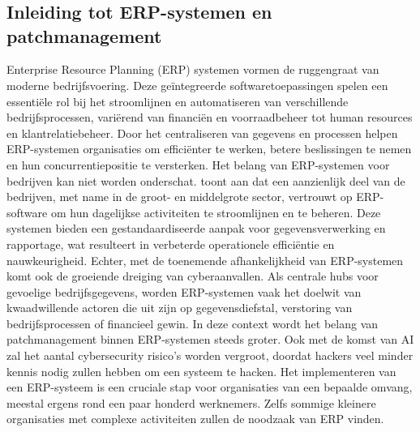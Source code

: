 \chapter{}%
\label{ch:stand-van-zaken}



\section{Inleiding tot ERP-systemen en patchmanagement}
Enterprise Resource Planning (ERP) systemen vormen de ruggengraat van moderne bedrijfsvoering. Deze geïntegreerde softwaretoepassingen spelen een essentiële rol bij het stroomlijnen en automatiseren van verschillende bedrijfsprocessen, variërend van financiën en voorraadbeheer tot human resources en klantrelatiebeheer. Door het centraliseren van gegevens en processen helpen ERP-systemen organisaties om efficiënter te werken, betere beslissingen te nemen en hun concurrentiepositie te versterken.
Het belang van ERP-systemen voor bedrijven kan niet worden onderschat. \textcite{Statistiek-Vlaanderen2022} toont aan dat een aanzienlijk deel van de bedrijven, met name in de groot- en middelgrote sector, vertrouwt op ERP-software om hun dagelijkse activiteiten te stroomlijnen en te beheren. Deze systemen bieden een gestandaardiseerde aanpak voor gegevensverwerking en rapportage, wat resulteert in verbeterde operationele efficiëntie en nauwkeurigheid.
Echter, met de toenemende afhankelijkheid van ERP-systemen komt ook de groeiende dreiging van cyberaanvallen. Als centrale hubs voor gevoelige bedrijfsgegevens, worden ERP-systemen vaak het doelwit van kwaadwillende actoren die uit zijn op gegevensdiefstal, verstoring van bedrijfsprocessen of financieel gewin. In deze context wordt het belang van patchmanagement binnen ERP-systemen steeds groter. Ook met de komst van AI zal het aantal cybersecurity risico’s worden vergroot, doordat hackers veel minder kennis nodig zullen hebben om een systeem te hacken.  \autocite{Pearson2024}
Het implementeren van een ERP-systeem is een cruciale stap voor organisaties van een bepaalde omvang, meestal ergens rond een paar honderd werknemers. Zelfs sommige kleinere organisaties met complexe activiteiten zullen de noodzaak van ERP vinden.
